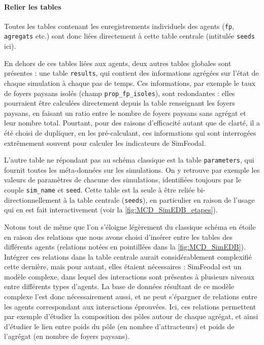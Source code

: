		\paragraph*{Relier les tables}

		Toutes les tables contenant les enregistrements individuels des agents (\texttt{fp}, \texttt{agregats} etc.) sont donc liées directement à cette table centrale (intitulée \texttt{seeds} ici).

		En dehors de ces tables liées aux agents, deux autres tables \og globales\fg{} sont présentes : une table \og \texttt{results}\fg{}, qui contient des informations agrégées sur l'état de chaque simulation à chaque pas de temps. Ces informations, par exemple le taux de foyers paysans isolés (champ \og \texttt{prop\_fp\_isoles}\fg{}), sont redondantes : elles pourraient être calculées directement depuis la table renseignant les foyers paysans, en faisant un ratio entre le nombre de foyers paysans sans agrégat et leur nombre total.
		Pourtant, pour des raisons d'efficacité autant que de clarté, il a été choisi de dupliquer, en les pré-calculant, ces informations qui sont interrogées extrêmement souvent pour calculer les indicateurs de SimFeodal.

		L'autre table ne répondant pas au schéma classique est la table \og \texttt{parameters}\fg{}, qui fournit toutes les méta-données sur les simulations. On y retrouve par exemple les valeurs de paramètres de chacune des simulations, identifiées toujours par le couple \texttt{sim\_name} et \texttt{seed}.
		Cette table est la seule à être reliée bi-directionnellement à la table centrale (\texttt{seeds}), en particulier en raison de l'usage qui en est fait interactivement (voir la \cref{fig:MCD_SimEDB_etapes}).

		Notons tout de même que l'on s'éloigne légèrement du classique schéma en étoile en raison des relations que nous avons choisi d'insérer entre les tables des différents agents (relations notées en pointillées dans la \cref{fig:MCD_SimEDB}).
		Intégrer ces relations dans la table centrale aurait considérablement complexifié cette dernière, mais pour autant, elles étaient nécessaires : SimFeodal est un modèle complexe, dans lequel des interactions sont présentes à plusieurs niveaux entre différents types d'agents. La base de données résultant de ce modèle complexe l'est donc nécessairement aussi, et ne peut s'épargner de relations entre les agents correspondant aux interactions éprouvées.
		Ici, ces relations permettent par exemple d'étudier la composition des pôles autour de chaque agrégat, et ainsi d'étudier le lien entre poids du pôle (en nombre d'attracteurs) et poids de l'agrégat (en nombre de foyers paysans).

